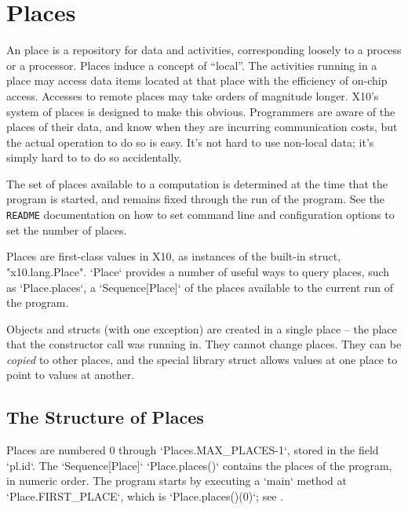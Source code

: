 
\chapter{Places}
\label{XtenPlaces}

An \Xten{} place is a repository for data and activities, corresponding
loosely to a process or a processor. Places induce a concept of ``local''. The
activities running in a place may access data items located at that place with
the efficiency of on-chip access. Accesses to remote places may take orders of
magnitude longer. X10's system of places is designed to make this obvious.
Programmers are aware of the places of their data, and know when they are
incurring communication costs, but the actual operation to do so is easy. It's
not hard to use non-local data; it's simply hard to to do so accidentally.

The set of places available to a computation is determined at the time that
the program is started, and remains fixed through the run of the program. See
the {\tt README} documentation on how to set command line and configuration
options to set the number of places.

Places are first-class values in X10, as instances of the built-in struct,
\xcd"x10.lang.Place".   \xcd`Place` provides a number of useful ways to
query places, such as \xcd`Place.places`, a \xcd`Sequence[Place]` of 
the places
available to the current run of the program.

Objects and structs (with one exception) are created in a single place -- the
place that the constructor call was running in. They cannot change places.
They can be {\em copied} to other places, and the special library struct
 allows values at one place to point to values at another.  

\section{The Structure of Places}

Places are numbered 0 through \xcd`Places.MAX_PLACES-1`, stored in the field
\xcd`pl.id`.  The \xcd`Sequence[Place]` \xcd`Place.places()` contains the places of the
program, in numeric order. 
The program starts by executing a \xcd`main` method at
\xcd`Place.FIRST_PLACE`, which is 
\xcd`Place.places()(0)`; see
. 


